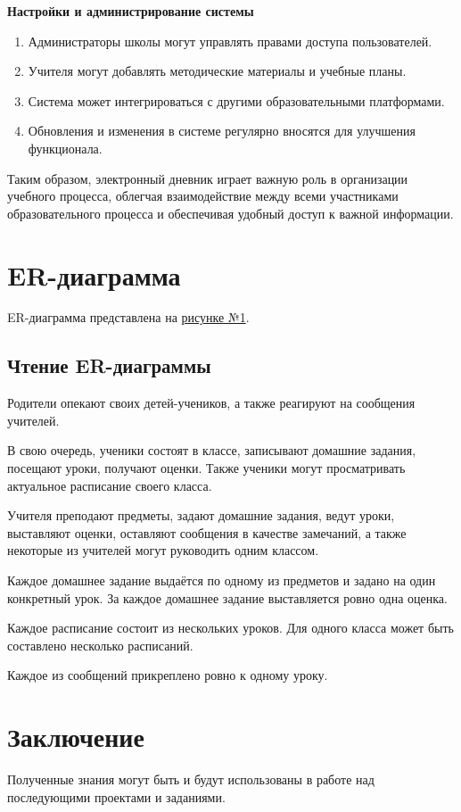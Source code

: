 \documentclass[a4paper, final]{article}
\begin{document}
\noindent \textbf{Настройки и администрирование системы}
\begin{enumerate}
  \item Администраторы школы могут управлять правами доступа пользователей.
  \item Учителя могут добавлять методические материалы и учебные планы.
  \item Система может интегрироваться с другими образовательными платформами.
  \item Обновления и изменения в системе регулярно вносятся для улучшения функционала.
\end{enumerate}
  
Таким образом, электронный дневник играет важную роль в организации учебного процесса, облегчая взаимодействие между всеми участниками образовательного процесса и обеспечивая удобный доступ к важной информации.

\newpage
\section{ER-диаграмма}
ER-диаграмма представлена на \hyperlink{diag:erd}{рисунке №1}.
% 

\subsection{Чтение ER-диаграммы}
Родители опекают своих детей-учеников, а также реагируют на сообщения учителей.

В свою очередь, ученики состоят в классе, записывают домашние задания, посещают уроки, получают оценки. Также ученики могут просматривать актуальное расписание своего класса.

Учителя преподают предметы, задают домашние задания, ведут уроки, выставляют оценки, оставляют сообщения в качестве замечаний, а также некоторые из учителей могут руководить одним классом.

Каждое домашнее задание выдаётся по одному из предметов и задано на один конкретный урок. За каждое домашнее задание выставляется ровно одна оценка.

Каждое расписание состоит из нескольких уроков. Для одного класса может быть составлено несколько расписаний.

Каждое из сообщений прикреплено ровно к одному уроку.


\newpage
\section*{Заключение}
Полученные знания могут быть и будут использованы в работе над последующими проектами и заданиями.

\cleardoublepage
{}
\newpage
\begin{thebibliography}{0}
\end{thebibliography}
\end{document}
